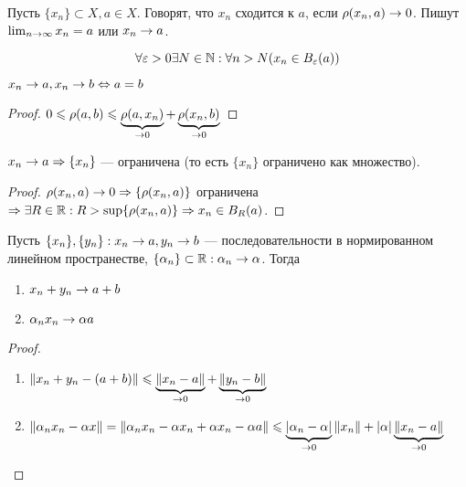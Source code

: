
\begin{definition}
    Пусть \(\{x_n\} \subset X, a \in X\). Говорят, что \(x_n\) сходится к \(a\), если \(\rho(x_n, a) \rightarrow 0\). Пишут \(\lim_{n \rightarrow \infty}x_n = a\) или \(x_n \rightarrow a\).
\end{definition}

\begin{note}
    \[\forall \varepsilon > 0 \exists N \in \mathbb{N}: \forall n > N (x_n \in B_{\varepsilon}(a))\]
\end{note}

\begin{corollary}
    \(x_n \rightarrow a, x_n \rightarrow b \Leftrightarrow a = b\)
\end{corollary}
\begin{proof}
    \(0 \leqslant \rho(a, b) \leqslant \underbrace{\rho(a, x_n)}_{\rightarrow 0} + \underbrace{\rho(x_n, b)}_{\rightarrow 0}\)
\end{proof}

\begin{corollary}
    \(x_n \rightarrow a \Rightarrow \{x_n\}\) --- ограничена (то есть \(\{x_n\}\) ограничено как множество).
\end{corollary}
\begin{proof}
    \(\rho(x_n, a) \rightarrow 0 \Rightarrow \{\rho(x_n, a)\}\) ограничена \(\Rightarrow \exists R \in \mathbb{R}: R > \sup\{\rho(x_n, a)\} \Rightarrow x_n \in B_R(a)\).
\end{proof}

\begin{corollary}
    Пусть \(\{x_n\}, \{y_n\}: x_n \rightarrow a, y_n \rightarrow b\) --- последовательности в нормированном линейном пространестве, \(\{\alpha_n\} \subset \mathbb{R}: \alpha_n \rightarrow \alpha\). Тогда
    \begin{enumerate}
        \item \(x_n + y_n \rightarrow a + b\)
        \item \(\alpha_nx_n \rightarrow \alpha a\)
    \end{enumerate}
\end{corollary}
\begin{proof}\indent
    \begin{enumerate}
        \item \(\|x_n + y_n - (a + b)\| \leqslant \underbrace{\|x_n - a\|}_{\rightarrow 0} + \underbrace{\|y_n - b\|}_{\rightarrow 0}\)
        \item \(\|\alpha_nx_n - \alpha x\| = \|\alpha_n x_n - \alpha x_n + \alpha x_n - \alpha a\| \leqslant \underbrace{|\alpha_n - \alpha|}_{\rightarrow 0}\|x_n\| + |\alpha|\underbrace{\|x_n - a\|}_{\rightarrow 0}\)
    \end{enumerate}    
\end{proof}
